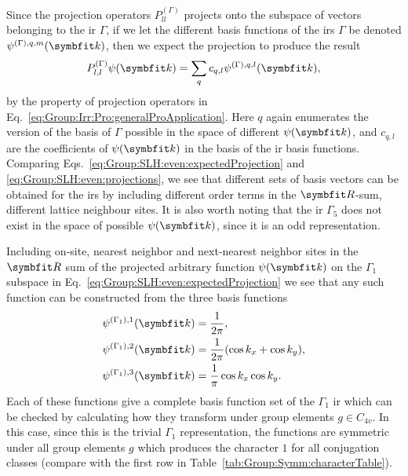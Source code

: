 %
Since the projection operators $P_{ll}^{(\Gamma)}$ projects onto the subspace of vectors belonging to the \ac{ir} $\Gamma$, if we
let the different basis functions of the \ac{ir}s $\Gamma$ be denoted $\psi^{(\Gamma),q,m}(\v{k})$, then we expect the projection to produce the result
\begin{equation}
    \label{eq:Group:SLH:even:expectedProjection}
    P_{l,l}^{(\Gamma)}\psi(\v{k}) = \sum_{q}c_{q,l}\psi^{(\Gamma),q,l}(\v{k}),
\end{equation}
by the property of projection operators in Eq.~\eqref{eq:Group:Irr:Pro:generalProApplication}. Here $q$ again enumerates the version of the basis of $\Gamma$ possible in the space of different $\psi(\v{k})$, and $c_{q,l}$ are the coefficients of
$\psi(\v{k})$ in the basis of the \ac{ir} basis functions. Comparing Eqs.~\eqref{eq:Group:SLH:even:expectedProjection} and \eqref{eq:Group:SLH:even:projections},
we see that different sets of basis vectors can be obtained for the \ac{ir}s by including different order terms in the $\v{R}$-sum,
\ie different lattice neighbour sites. It is also worth noting that the \ac{ir} $\Gamma_5$ does not exist in the space of possible $\psi(\v{k})$,
since it is an odd representation.

Including on-site, nearest neighbor and next-nearest neighbor sites in the $\v{R}$ sum of the projected arbitrary function $\psi(\v{k})$ on the $\Gamma_1$ subspace in
Eq.~\eqref{eq:Group:SLH:even:expectedProjection} we see that any such function can be constructed from the three basis functions
\begin{subequations}
    \label{eq:Group:SLH:even:G1basis}
    \begin{align}
        \label{eq:Group:SLH:even:G1basis:1}
        \psi^{(\Gamma_1),1}(\v{k}) &= \frac{1}{2\pi},\\
        \label{eq:Group:SLH:even:G1basis:2}
        \psi^{(\Gamma_1),2}(\v{k}) &= \frac{1}{2\pi}(\cos k_x + \cos k_y),\\
        \label{eq:Group:SLH:even:G1basis:3}
        \psi^{(\Gamma_1),3}(\v{k}) &= \frac{1}{\pi}\cos k_x \cos k_y.
    \end{align}
\end{subequations}
Each of these functions give a complete basis function set of the $\Gamma_1$ \ac{ir} which can be checked by calculating how they transform under
group elements $g\in C_{4v}$. In this case, since this is the trivial $\Gamma_1$ representation, the functions are symmetric under all group elements $g$ which
produces the character $1$ for all conjugation classes (compare with the first row in Table~\ref{tab:Group:Symm:characterTable}). 

